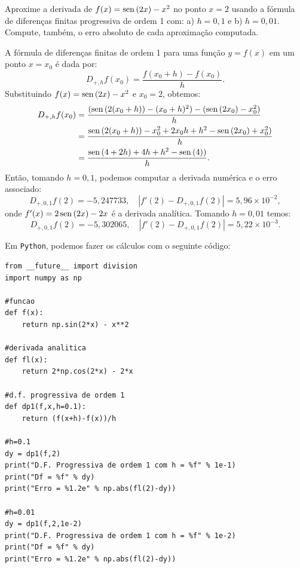 \begin{exeresol}
Aproxime a derivada de $f(x)=\operatorname{sen}\,(2x) - x^2$ no ponto $x=2$ usando a fórmula de diferenças finitas progressiva de ordem 1 com: a) $h=0,1$ e b) $h=0,01$. Compute, também, o erro absoluto de cada aproximação computada.
\end{exeresol}
\begin{resol}
  A fórmula de diferenças finitas de ordem 1 para uma função $y = f(x)$ em um ponto $x = x_0$ é dada por:
  \begin{equation*}
    D_{+,h}f(x_0) = \frac{f(x_0+h) - f(x_0)}{h}.
  \end{equation*}
Substituindo $f(x) = \operatorname{sen}\,(2x) - x^2$ e $x_0 = 2$, obtemos:
  \begin{equation*}
    \begin{split}
      D_{+,h}f(x_0) &= \frac{(\operatorname{sen}\,(2(x_0+h)) - (x_0+h)^2) - (\operatorname{sen}\,(2x_0) - x_0^2)}{h}\\
      &= \frac{\operatorname{sen}\,(2(x_0+h)) - x_0^2 + 2x_0h + h^2 - \operatorname{sen}\,(2x_0) + x_0^2)}{h}\\
      &= \frac{\operatorname{sen}\,(4+2h) + 4h + h^2 - \operatorname{sen}\,(4))}{h}.
    \end{split}
  \end{equation*}
Então, tomando $h=0,1$, podemos computar a derivada numérica e o erro associado:
\begin{equation*}
  D_{+,0,1}f(2) = -5,247733,\quad |f'(2)-D_{+,0,1}f(2)| = 5,96\times 10^{-2},
\end{equation*}
onde $f'(x) = 2\operatorname{sen}\,(2x) - 2x$ é a derivada analítica. Tomando $h=0,01$ temos:
\begin{equation*}
  D_{+,0,1}f(2) = -5,302065,\quad |f'(2)-D_{+,0,1}f(2)| = 5,22\times 10^{-3}.
\end{equation*}

\ifispython
Em \verb+Python+, podemos fazer os cálculos com o seguinte código:
\begin{verbatim}
from __future__ import division
import numpy as np

#funcao
def f(x):
    return np.sin(2*x) - x**2

#derivada analitica
def fl(x):
    return 2*np.cos(2*x) - 2*x

#d.f. progressiva de ordem 1
def dp1(f,x,h=0.1):
    return (f(x+h)-f(x))/h

#h=0.1
dy = dp1(f,2)
print("D.F. Progressiva de ordem 1 com h = %f" % 1e-1)
print("Df = %f" % dy)
print("Erro = %1.2e" % np.abs(fl(2)-dy))

#h=0.01
dy = dp1(f,2,1e-2)
print("D.F. Progressiva de ordem 1 com h = %f" % 1e-2)
print("Df = %f" % dy)
print("Erro = %1.2e" % np.abs(fl(2)-dy))
\end{verbatim}
\fi
\end{resol}


